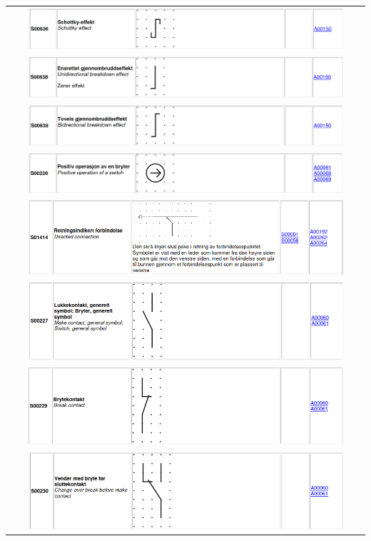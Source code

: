 \documentclass{article}
\begin{document}
\begin{center}
\begin{longtable}{c}
        \includegraphics[width=0.9\textwidth]{bilder/s00636.png}\\
        \includegraphics[width=0.9\textwidth]{bilder/s00638.png}\\
        \includegraphics[width=0.9\textwidth]{bilder/s00639.png}\\
        \includegraphics[width=0.9\textwidth]{bilder/s00226.png}\\
        \includegraphics[width=0.9\textwidth]{bilder/s01414.png}\\
       \includegraphics[width=0.9\textwidth]{bilder/s00227.png}\\
        \includegraphics[width=0.9\textwidth]{bilder/s00229.png}\\
        \includegraphics[width=0.9\textwidth]{bilder/s00230.png}\\
        
    \end{longtable}
\end{center}
\end{document}
